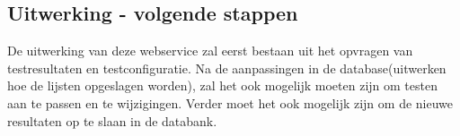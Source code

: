 \documentclass[11pt]{article}
\begin{document}
\subsection{Uitwerking - volgende stappen}
De uitwerking van deze webservice zal eerst bestaan uit het opvragen van testresultaten en testconfiguratie.
Na de aanpassingen in de database(uitwerken hoe de lijsten opgeslagen worden), zal het ook mogelijk moeten zijn om testen aan te passen en te wijzigingen. 
Verder moet het ook mogelijk zijn om de nieuwe resultaten op te slaan in de databank.
\end{document}
